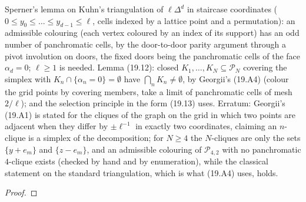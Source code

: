 \begin{theorem}
    \label{thm:dg-19-12}
    \leanok

    Sperner's lemma on Kuhn's triangulation of $\ell\Delta^d$ in staircase coordinates
    ($0 \leq y_0 \leq \dots \leq y_{d-1} \leq \ell$, cells indexed by a lattice point and a
    permutation): an admissible colouring (each vertex coloured by an index of its support) has an
    odd number of panchromatic cells, by the door-to-door parity argument through a pivot
    involution on doors, the fixed doors being the panchromatic cells of the face $\alpha_d = 0$;
    $\ell \geq 1$ is needed. Lemma (19.12): closed $K_1,\dots,K_N \subseteq \mathcal P_N$ covering
    the simplex with $K_n \cap \{\alpha_n = 0\} = \emptyset$ have $\bigcap_n K_n \neq \emptyset$,
    by Georgii's (19.A4) (colour the grid points by covering members, take a limit of panchromatic
    cells of mesh $2/\ell$); and the selection principle in the form (19.13) uses. Erratum:
    Georgii's (19.A1) is stated for the cliques of the graph on the grid in which two points are
    adjacent when they differ by $\pm\ell^{-1}$ in exactly two coordinates, claiming an $n$-clique
    is a simplex of the decomposition; for $N \geq 4$ the $N$-cliques are only the sets
    $\{y + e_m\}$ and $\{z - e_m\}$, and an admissible colouring of $\mathcal P_{4,2}$ with no
    panchromatic $4$-clique exists (checked by hand and by enumeration), while the classical
    statement on the standard triangulation, which is what (19.A4) uses, holds.
\end{theorem}
\begin{proof}
    \leanok
\end{proof}

